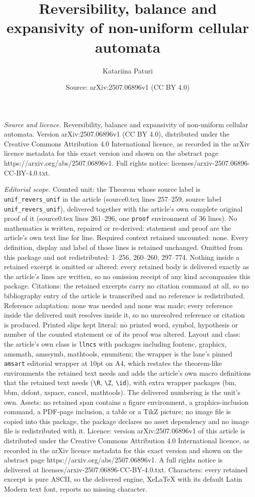 \documentclass[10pt,a4paper]{amsart}
\title[Reversibility, balance and expansivity of non-uniform cellul]{Reversibility, balance and expansivity of non-uniform cellular automata}
\author{Katariina Paturi}
\date{Source: arXiv:2507.06896v1 (CC BY 4.0)}
\begin{document}
\maketitle

\noindent\emph{Source and licence.} Reversibility, balance and expansivity of non-uniform cellular automata. Version arXiv:2507.06896v1 (CC BY 4.0), distributed under the Creative Commons Attribution 4.0 International licence, as recorded in the arXiv licence metadata for this exact version and shown on the abstract page https://arxiv.org/abs/2507.06896v1. Full rights notice: licenses/arxiv-2507.06896-CC-BY-4.0.txt.\par\smallskip

\noindent\textit{Editorial scope.} Counted unit: the Theorem whose source label is \texttt{unif\_revers\_unif} in the article (source0.tex lines 257--259, source label \texttt{unif\_revers\_unif}), delivered together with the article's own complete original proof of it (source0.tex lines 261--296, one \texttt{proof} environment of 36 lines). No mathematics is written, repaired or re-derived: statement and proof are the article's own text line for line. Required context retained uncounted: none. Every definition, display and label of those lines is retained unchanged. Omitted from this package and not redistributed: 1--256, 260--260, 297--774. Nothing inside a retained excerpt is omitted or altered: every retained body is delivered exactly as the article's lines are written, so no omission receipt of any kind accompanies this package. Citations: the retained excerpts carry no citation command at all, so no bibliography entry of the article is transcribed and no reference is redistributed. Reference adaptation: none was needed and none was made; every reference inside the delivered unit resolves inside it, so no unresolved reference or citation is produced. Printed slips kept literal: no printed word, symbol, hypothesis or number of the counted statement or of its proof was altered. Layout and class: the article's own class is \texttt{llncs} with packages including fontenc, graphicx, amsmath, amssymb, mathtools, enumitem; the wrapper is the lane's pinned \texttt{amsart} editorial wrapper at 10pt on A4, which restates the theorem-like environments the retained text needs and adds the article's own macro definitions that the retained text needs (\texttt{\textbackslash R}, \texttt{\textbackslash Z}, \texttt{\textbackslash id}), with extra wrapper packages (bm, bbm, dsfont, xspace, cancel, mathtools). The delivered numbering is the unit's own. Assets: no retained span contains a figure environment, a graphics-inclusion command, a PDF-page inclusion, a table or a TikZ picture; no image file is copied into this package, the package declares no asset dependency and no image file is redistributed with it. Licence: version arXiv:2507.06896v1 of this article is distributed under the Creative Commons Attribution 4.0 International licence, as recorded in the arXiv licence metadata for this exact version and shown on the abstract page https://arxiv.org/abs/2507.06896v1. A full rights notice is delivered at licenses/arxiv-2507.06896-CC-BY-4.0.txt. Characters: every retained excerpt is pure ASCII, so the delivered engine, XeLaTeX with its default Latin Modern text font, reports no missing character.
\end{document}
